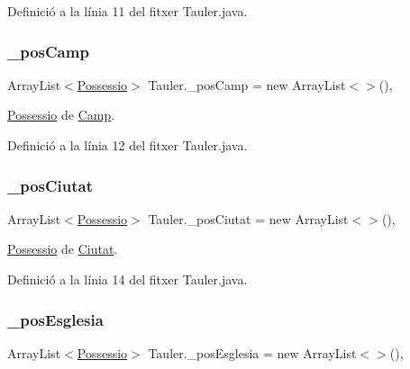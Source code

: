 Definició a la línia 11 del fitxer Tauler.\+java.

\mbox{\label{class_tauler_aabba1a73c429cd83aede59f3f5a19b96}} 
\subsubsection{\texorpdfstring{\+\_\+pos\+Camp}{\_posCamp}}
{\footnotesize\ttfamily Array\+List$<$\mbox{\hyperlink{class_possessio}{Possessio}}$>$ Tauler.\+\_\+pos\+Camp = new Array\+List$<$$>$()\hspace{0.3cm}{\ttfamily [static]}, {\ttfamily [private]}}



\mbox{\hyperlink{class_possessio}{Possessio}} de \mbox{\hyperlink{class_camp}{Camp}}. 



Definició a la línia 12 del fitxer Tauler.\+java.

\mbox{\label{class_tauler_ac1c8bd3eed1b45e5c839697b5a64a169}} 
\subsubsection{\texorpdfstring{\+\_\+pos\+Ciutat}{\_posCiutat}}
{\footnotesize\ttfamily Array\+List$<$\mbox{\hyperlink{class_possessio}{Possessio}}$>$ Tauler.\+\_\+pos\+Ciutat = new Array\+List$<$$>$()\hspace{0.3cm}{\ttfamily [static]}, {\ttfamily [private]}}



\mbox{\hyperlink{class_possessio}{Possessio}} de \mbox{\hyperlink{class_ciutat}{Ciutat}}. 



Definició a la línia 14 del fitxer Tauler.\+java.

\mbox{\label{class_tauler_ad72c3f886d285bbd4c73afa2e4e4bd46}} 
\subsubsection{\texorpdfstring{\+\_\+pos\+Esglesia}{\_posEsglesia}}
{\footnotesize\ttfamily Array\+List$<$\mbox{\hyperlink{class_possessio}{Possessio}}$>$ Tauler.\+\_\+pos\+Esglesia = new Array\+List$<$$>$()\hspace{0.3cm}{\ttfamily [static]}, {\ttfamily [private]}}




